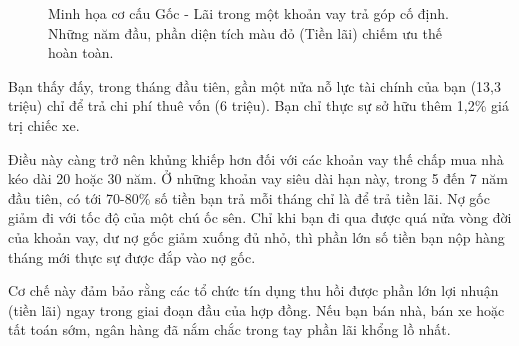 \documentclass[14pt, a4paper, oneside]{extreport}
\begin{document}
\begin{figure}[htbp]
    \centering
    \caption{Minh họa cơ cấu Gốc - Lãi trong một khoản vay trả góp cố định. Những năm đầu, phần diện tích màu đỏ (Tiền lãi) chiếm ưu thế hoàn toàn.}
    \label{fig:khauhao}
\end{figure}

Bạn thấy đấy, trong tháng đầu tiên, gần một nửa nỗ lực tài chính của bạn (13,3 triệu) chỉ để trả chi phí thuê vốn (6 triệu). Bạn chỉ thực sự sở hữu thêm 1,2\% giá trị chiếc xe. 

Điều này càng trở nên khủng khiếp hơn đối với các khoản vay thế chấp mua nhà kéo dài 20 hoặc 30 năm. Ở những khoản vay siêu dài hạn này, trong 5 đến 7 năm đầu tiên, có tới 70-80\% số tiền bạn trả mỗi tháng chỉ là để trả tiền lãi. Nợ gốc giảm đi với tốc độ của một chú ốc sên. Chỉ khi bạn đi qua được quá nửa vòng đời của khoản vay, dư nợ gốc giảm xuống đủ nhỏ, thì phần lớn số tiền bạn nộp hàng tháng mới thực sự được đắp vào nợ gốc. 

Cơ chế này đảm bảo rằng các tổ chức tín dụng thu hồi được phần lớn lợi nhuận (tiền lãi) ngay trong giai đoạn đầu của hợp đồng. Nếu bạn bán nhà, bán xe hoặc tất toán sớm, ngân hàng đã nắm chắc trong tay phần lãi khổng lồ nhất.
\end{document}

